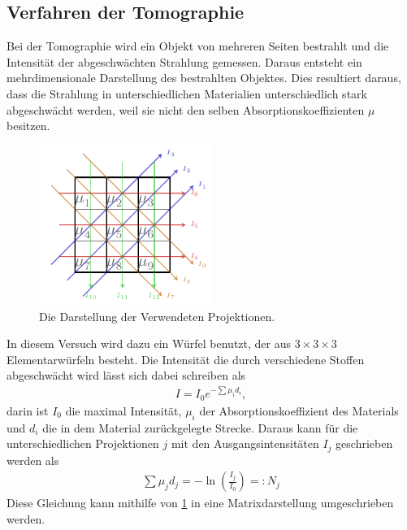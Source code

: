 \subsection{Verfahren der Tomographie}
Bei der Tomographie wird ein Objekt von mehreren Seiten bestrahlt und die Intensität der abgeschwächten Strahlung gemessen.
Daraus entsteht ein mehrdimensionale Darstellung des bestrahlten Objektes.
Dies resultiert daraus, dass die Strahlung in unterschiedlichen Materialien unterschiedlich stark abgeschwächt werden, weil sie nicht den selben Absorptionskoeffizienten $\mu$ besitzen.
\begin{figure}
	\centering
	\includegraphics[width=0.5\textwidth]{../Grafiken/Tikz/tikz-Projektionen.pdf}
	\caption{Die Darstellung der Verwendeten Projektionen.\label{fig:Projektion}}
\end{figure}
In diesem Versuch wird dazu ein Würfel benutzt, der aus $3\times3\times3$ Elementarwürfeln besteht.
Die Intensität die durch verschiedene Stoffen abgeschwächt wird lässt sich dabei schreiben als
\begin{align}
	I = I_0e^{-\sum \mu_i d_i},
\end{align}
darin ist $I_0$ die maximal Intensität, $\mu_i$ der Absorptionskoeffizient des Materials und $d_i$ die in dem Material zurückgelegte Strecke. 
Daraus kann für die unterschiedlichen Projektionen $j$ mit den Ausgangsintensitäten $I_j$ geschrieben werden als
\begin{align}
	\sum \mu_j d_j = -\ln\left(\frac{I_j}{I_0}\right)=:N_j
\end{align}
\newpage
Diese Gleichung kann mithilfe von \cref{fig:Projektion} in eine Matrixdarstellung umgeschrieben werden.

